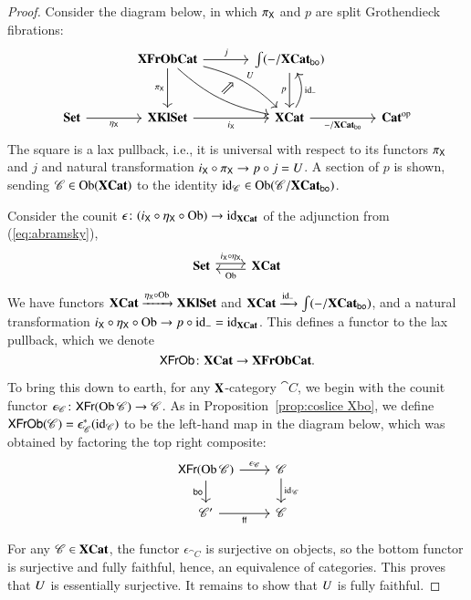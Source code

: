 \documentclass[12pt,oneside,article,draft]{memoir}
\begin{document}
\begin{proof}
Consider the diagram below, in which $\pi_{\mathsf{X}}$ and $p$ are split Grothendieck fibrations:
$$
\begin{tikzcd}[row sep=large,column sep=large]
&
\Cat{XFrObCat}\ar[r,"j"]\ar[d,"\pi_{\Fun{X}}"']\ar[dr,bend left=15pt,"U"]\ar[dr,bend right=15pt]\ar[dr,phantom,"\Nearrow"]&
\int(-/\XCat_{\bo})\ar[d,"p"']\\
\Set\ar[r,"\eta_{\Fun{X}}"']&\Cat{XKlSet}\ar[r,"i_{\Fun{X}}"']&
\XCat\ar[u,bend right,"\id_{-}"']\ar[r,"-/\XCat_{\bo}"']&\op{\Cat{Cat}}
\end{tikzcd}
$$
The square is a lax pullback, i.e., it is universal with respect to its functors $\pi_{\mathsf{X}}$ and $j$ and natural transformation $i_{\mathsf{X}}\circ\pi_{\mathsf{X}}\to p\circ j=U$. A section of $p$ is shown, sending $\mathscr{C}\in\operatorname{Ob}(\mathbf{XCat})$ to the identity $\operatorname{id}_{\mathscr{C}}\in\operatorname{Ob}(\mathscr{C}/\mathbf{XCat}_{\mathsf{bo}})$. 

Consider the counit $\epsilon\colon (i_{\mathsf{X}}\circ\eta_{\mathsf{X}}\circ\operatorname{Ob})\to\operatorname{id}_{\mathbf{XCat}}$ of the adjunction from (\ref{eq:abramsky}),
$$
\begin{tikzcd}
\Cat{Set}\arrow[r, shift left=.5ex, "i_{\Fun{X}}\circ\eta_{\Fun{X}}"]&\XCat\arrow[l, shift left=.5ex,"\Ob"]
\end{tikzcd}
$$
We have functors $\mathbf{XCat}\xrightarrow{\eta_{\mathsf{X}}\circ\operatorname{Ob}}\mathbf{XKlSet}$ and $\mathbf{XCat}\xrightarrow{\operatorname{id}_{-}}\int(-/\mathbf{XCat}_{\mathsf{bo}})$, and a natural transformation $i_{\mathsf{X}}\circ\eta_{\mathsf{X}}\circ\operatorname{Ob}\to p\circ\operatorname{id}_{-}=\operatorname{id}_{\mathbf{XCat}}$. This defines a functor to the lax pullback, which we denote
$$\mathsf{XFrOb}\colon\mathbf{XCat}\to\mathbf{XFrObCat}.$$

To bring this down to earth, for any $\mathbf{X}$-category $\cat{C}$, we begin with the counit functor $\epsilon_{\mathscr{C}}\colon\mathsf{XFr}(\operatorname{Ob}\mathscr{C})\to\mathscr{C}$. As in Proposition~\ref{prop:coslice Xbo}, we define $\mathsf{XFrOb}(\mathscr{C})=\epsilon_{\mathscr{C}}^*(\operatorname{id}_{\mathscr{C}})$ to be the left-hand map in the diagram below, which was obtained by factoring the top right composite:
$$
\begin{tikzcd}
\Fun{XFr}(\Ob\cat{C})\arrow[d, "\bo"']\arrow[r, "\epsilon_{\cat{C}}"]&\cat{C}\ar[d,"\id_{\cat{C}}"]\\
\cat{C'}\arrow[r, "\ff"']&\cat{C}
\end{tikzcd}
$$


For any $\mathscr{C}\in\mathbf{XCat}$, the functor $\epsilon_{\cat{C}}$ is surjective on objects, so the bottom functor is surjective and fully faithful, hence, an equivalence of categories. This proves that $U$ is essentially surjective. It remains to show that $U$ is fully faithful.


\end{proof}
\end{document}
